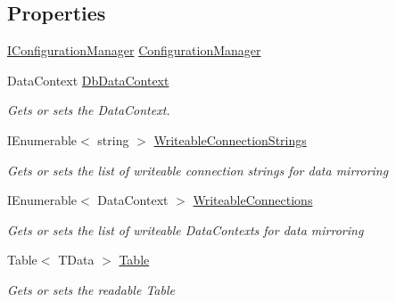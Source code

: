 \subsection*{Properties}
\begin{DoxyCompactItemize}
\item 
\hyperlink{interfaceCqrs_1_1Configuration_1_1IConfigurationManager}{I\+Configuration\+Manager} \hyperlink{classCqrs_1_1DataStores_1_1SqlDataStore_a9d720406a3c3abbd8bf1924bd81874ac_a9d720406a3c3abbd8bf1924bd81874ac}{Configuration\+Manager}
\item 
Data\+Context \hyperlink{classCqrs_1_1DataStores_1_1SqlDataStore_aa944d65b800ad9ba7809e96ed2b86f26_aa944d65b800ad9ba7809e96ed2b86f26}{Db\+Data\+Context}
\begin{DoxyCompactList}\small\item\em Gets or sets the Data\+Context. \end{DoxyCompactList}\item 
I\+Enumerable$<$ string $>$ \hyperlink{classCqrs_1_1DataStores_1_1SqlDataStore_adfdf7101f6c644f4b4ad074a2edf0a42_adfdf7101f6c644f4b4ad074a2edf0a42}{Writeable\+Connection\+Strings}
\begin{DoxyCompactList}\small\item\em Gets or sets the list of writeable connection strings for data mirroring \end{DoxyCompactList}\item 
I\+Enumerable$<$ Data\+Context $>$ \hyperlink{classCqrs_1_1DataStores_1_1SqlDataStore_af37a59f184ce77c2204834e60c8f76aa_af37a59f184ce77c2204834e60c8f76aa}{Writeable\+Connections}
\begin{DoxyCompactList}\small\item\em Gets or sets the list of writeable Data\+Contexts for data mirroring \end{DoxyCompactList}\item 
Table$<$ T\+Data $>$ \hyperlink{classCqrs_1_1DataStores_1_1SqlDataStore_abcd0a88f984a275880f402baadaae2c7_abcd0a88f984a275880f402baadaae2c7}{Table}
\begin{DoxyCompactList}\small\item\em Gets or sets the readable Table \end{DoxyCompactList}\item 

\end{DoxyCompactItemize}
